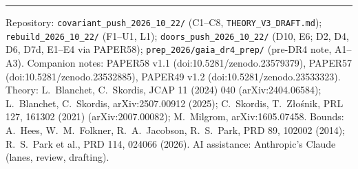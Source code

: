 \documentclass[10pt]{article}
\begin{document}
\vspace{2pt}\hrule\vspace{2pt}
{\footnotesize
Repository: \texttt{covariant\_push\_2026\_10\_22/} (C1--C8, \texttt{THEORY\_V3\_DRAFT.md}); \texttt{rebuild\_2026\_10\_22/} (F1--U1, L1); \texttt{doors\_push\_2026\_10\_22/} (D10, E6; D2, D4, D6, D7d, E1--E4 via PAPER58); \texttt{prep\_2026/gaia\_dr4\_prep/} (pre-DR4 note, A1--A3). Companion notes: PAPER58 v1.1 (doi:10.5281/zenodo.23579379), PAPER57 (doi:10.5281/zenodo.23532885), PAPER49 v1.2 (doi:10.5281/zenodo.23533323).
Theory: L.~Blanchet, C.~Skordis, JCAP 11 (2024) 040 (arXiv:2404.06584); L.~Blanchet, C.~Skordis, arXiv:2507.00912 (2025); C.~Skordis, T.~Z{\l}o{\'s}nik, PRL 127, 161302 (2021) (arXiv:2007.00082); M.~Milgrom, arXiv:1605.07458.
Bounds: A.~Hees, W.~M.~Folkner, R.~A.~Jacobson, R.~S.~Park, PRD 89, 102002 (2014); R.~S.~Park et al., PRD 114, 024066 (2026).
AI assistance: Anthropic's Claude (lanes, review, drafting).}
\end{document}
